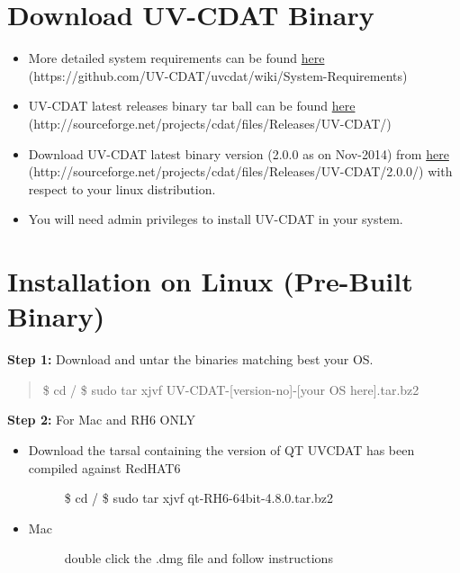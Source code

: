 \documentclass[letterpaper,10pt,english]{sphinxmanual}
\begin{document}
\section{Download UV-CDAT Binary}
\label{getting_started:download-uv-cdat-binary}\begin{itemize}
\item {} 
More detailed system requirements can be found \href{https://github.com/UV-CDAT/uvcdat/wiki/System-Requirements}{here} (https://github.com/UV-CDAT/uvcdat/wiki/System-Requirements)

\item {} 
UV-CDAT latest releases binary tar ball can be found \href{http://sourceforge.net/projects/cdat/files/Releases/UV-CDAT/}{here} (http://sourceforge.net/projects/cdat/files/Releases/UV-CDAT/)

\item {} 
Download UV-CDAT latest binary version (2.0.0 as on Nov-2014) from \href{http://sourceforge.net/projects/cdat/files/Releases/UV-CDAT/2.0.0/}{here} (http://sourceforge.net/projects/cdat/files/Releases/UV-CDAT/2.0.0/)  with respect to your linux distribution.

\item {} 
You will need admin privileges to install UV-CDAT in your system.

\end{itemize}


\section{Installation on Linux  (Pre-Built Binary)}
\label{getting_started:installation-on-linux-pre-built-binary}
\textbf{Step 1:} Download and untar the binaries matching best your OS.
\begin{quote}

\$ cd /
\$ sudo tar xjvf UV-CDAT-{[}version-no{]}-{[}your OS here{]}.tar.bz2
\end{quote}

\textbf{Step 2:} For Mac and RH6 ONLY
\begin{itemize}
\item {} \begin{description}
\item[{Download the tarsal containing the version of QT UVCDAT has been compiled against RedHAT6}] \leavevmode
\$ cd /
\$ sudo tar xjvf qt-RH6-64bit-4.8.0.tar.bz2

\end{description}

\item {} \begin{description}
\item[{Mac}] \leavevmode
double click the .dmg file and follow instructions

\end{description}

\end{itemize}
\end{document}
